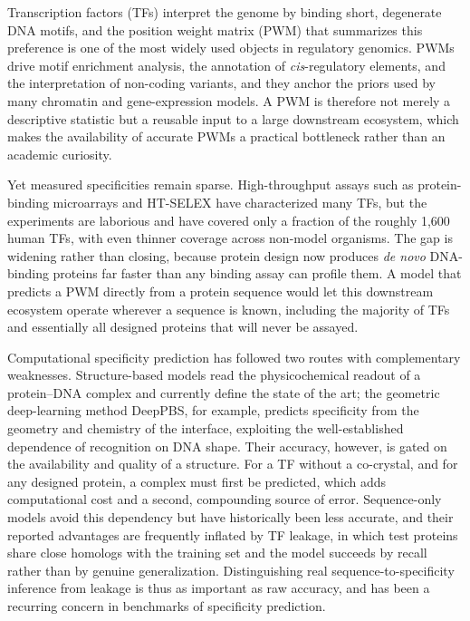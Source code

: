 \documentclass[11pt]{article}
\begin{document}
Transcription factors (TFs) interpret the genome by binding short, degenerate DNA
motifs, and the position weight matrix (PWM) that summarizes this preference is
one of the most widely used objects in regulatory genomics. PWMs drive motif
enrichment analysis, the annotation of \emph{cis}-regulatory elements, and the
interpretation of non-coding variants, and they anchor the priors used by many
chromatin and gene-expression models\cite{stormo2000dna,weirauch2014cisbp,castromondragon2022jaspar,kulakovskiy2018hocomoco,avsec2021enformer}.
A PWM is therefore not merely a descriptive statistic but a reusable input to a
large downstream ecosystem, which makes the availability of accurate PWMs a
practical bottleneck rather than an academic curiosity.

Yet measured specificities remain sparse. High-throughput assays such as
protein-binding microarrays\cite{berger2006compact,badis2009diversity} and
HT-SELEX\cite{jolma2013dna} have characterized many TFs, but the experiments are
laborious and have covered only a fraction of the roughly 1,600 human
TFs\cite{vaquerizas2009census,lambert2018human}, with even thinner coverage across
non-model organisms.
The gap is widening rather than closing, because protein design now produces
\emph{de novo} DNA-binding proteins far faster than any binding assay can profile
them. A model that predicts a PWM directly from a protein sequence would let this
downstream ecosystem operate wherever a sequence is known, including the majority
of TFs and essentially all designed proteins that will never be assayed.

Computational specificity prediction has followed two routes with complementary
weaknesses. Structure-based models read the physicochemical readout of a
protein--DNA complex and currently define the state of the art; the geometric
deep-learning method DeepPBS, for example, predicts specificity from the geometry
and chemistry of the interface, exploiting the well-established dependence of
recognition on DNA shape\cite{rohs2009dnashape,zhou2013dnashape,mitra2024deeppbs}.
Their accuracy, however, is gated on the availability and quality of a structure.
For a TF without a co-crystal, and for any designed protein, a complex must first be
predicted\cite{jumper2021alphafold,baek2021rosettafold,abramson2024alphafold3}, which
adds computational cost and a second, compounding source of error. Sequence-only
models avoid this dependency but have historically been less
accurate\cite{alipanahi2015deepbind,zhou2015deepsea,kelley2016basset,eraslan2019deeplearning},
and their reported advantages are frequently inflated by TF leakage, in which test
proteins share close homologs with the training set and the model succeeds by recall
rather than by genuine generalization\cite{mitra2024deeppbs}. Distinguishing real
sequence-to-specificity inference from leakage is thus as important as raw accuracy,
and has been a recurring concern in benchmarks of specificity
prediction\cite{weirauch2013evaluation}.
\end{document}
